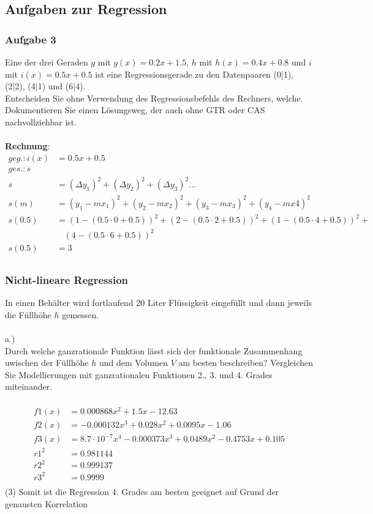 \documentclass[a4paper,12pt]{article}
\begin{document}
\subsection{Aufgaben zur Regression}
\subsubsection{Aufgabe 3}
Eine der drei Geraden $g$ mit $g(x) = 0.2x + 1.5$, $h$ mit $h(x) = 0.4x + 0.8$
und $i$ mit $i(x) = 0.5x + 0.5$ ist eine Regressionsgerade zu den Datenpaaren (0|1), 
(2|2), (4|1) und (6|4).\\
Entscheiden Sie ohne Verwendung des Regressionsbefehls des Rechners, welche. Dokumentieren
Sie einen Lösungsweg, der auch ohne GTR oder CAS\\
nachvollziehbar ist.\\
\\
\textbf{Rechnung}:\\
\begin{equation*}
\begin{split}
geg.: i(x) & = 0.5x + 0.5\\
ges.: s\ \ \ \ &\\
s & = (\Delta y_1)^2 + (\Delta y_2)^2 + (\Delta y_3)^2 ...\\
s(m) & = (y_1 - mx_1)^2 + (y_2 - mx_2)^2 + (y_3 - mx_3)^2 + (y_4 - mx4)^2\\
s(0.5) & = (1 - (0.5 \cdot 0 + 0.5))^2 + (2 - (0.5 \cdot 2 + 0.5))^2 + (1 - (0.5 \cdot 4 + 0.5))^2 + \\
&\ \ \ \ (4 - (0.5 \cdot 6 + 0.5))^2\\
s(0.5) & = 3\\
\end{split}
\end{equation*}
\pagebreak
\subsubsection{Nicht-lineare Regression}
In einen Behälter wird fortlaufend 20 Liter Flüssigkeit eingefüllt und dann jeweils die Füllhöhe $h$ gemessen.\\
\\
a.)\\
Durch welche ganzrationale Funktion lässt sich der funktionale Zusammenhang uwischen der Füllhöhe $h$ und dem Volumen $V$
am besten beschreiben? Vergleichen Sie Modellierungen mit ganzrationalen Funktionen 2., 3. und 4. Grades miteinander.\\\\
\begin{equation*}
\begin{split}
f1(x) & = 0.000868x^2 + 1.5x -12.63\\
f2(x) & = -0.000132x^3+0.028x^2+0.0095x-1.06\\
f3(x) & = 8.7 \cdot 10^{-7} x^4-0.000373x^3 + 0.0489x^2 - 0.4753x + 0.105\\
r1^2 & = 0.981144\\
r2^2 & = 0.999137\\
r3^2 & = 0.9999\\
\end{split}
\end{equation*}
(3) Somit ist die Regression 4. Grades am besten geeignet auf Grund der genausten Korrelation 
\pagebreak
\end{document}
